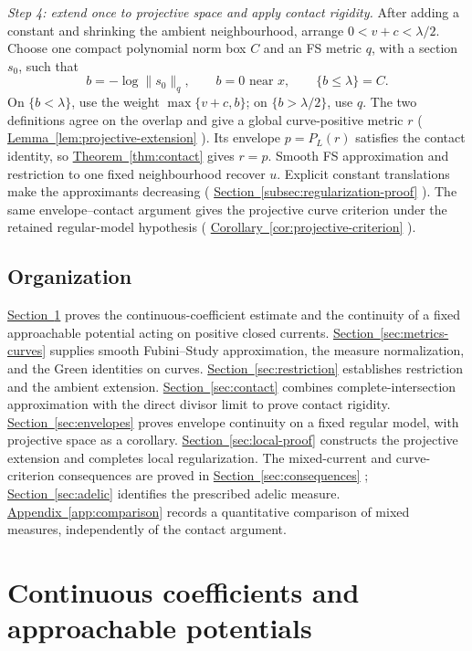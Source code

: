 \documentclass[11pt]{amsart}
\theoremstyle{definition}
\theoremstyle{remark}
\numberwithin{equation}{section}
\newcommand{\namedref}[2]{%
 \begingroup
 \ifstrequal{#1}{Section}{\hypersetup{linkcolor=sectionteal}}{%
  \ifstrequal{#1}{Appendix}{\hypersetup{linkcolor=sectionteal}}{}}%
 \hyperref[#2]{#1~\ref*{#2}}%
 \endgroup}
\begin{document}
\emph{Step 4: extend once to projective space and apply contact rigidity.}
After adding a constant and shrinking the ambient neighbourhood, arrange
\(0<v+c<\lambda/2\). Choose one compact polynomial norm box \(C\) and
an FS metric \(q\), with a section \(s_0\), such that
\[
 b=-\log\|s_0\|_q,\qquad b=0\text{ near }x,
 \qquad\{b\le\lambda\}=C.
\]
On \(\{b<\lambda\}\), use the weight \(\max\{v+c,b\}\); on
\(\{b>\lambda/2\}\), use \(q\). The two definitions agree on the
overlap and give a global curve-positive metric \(r\)
(\namedref{Lemma}{lem:projective-extension}). Its envelope \(p=P_L(r)\)
satisfies the contact identity, so \namedref{Theorem}{thm:contact} gives
\(r=p\). Smooth FS approximation and restriction to one fixed
neighbourhood recover \(u\). Explicit constant translations make the
approximants decreasing (\namedref{Section}{subsec:regularization-proof}).
The same envelope--contact argument gives the projective curve criterion
under the retained regular-model hypothesis
(\namedref{Corollary}{cor:projective-criterion}).

\subsection{Organization}
\namedref{Section}{sec:coefficients} proves the continuous-coefficient
estimate and the continuity of a fixed approachable potential acting
on positive closed currents. \namedref{Section}{sec:metrics-curves} supplies
smooth Fubini--Study approximation, the measure normalization, and
the Green identities on curves. \namedref{Section}{sec:restriction}
establishes restriction and the ambient extension.
\namedref{Section}{sec:contact} combines complete-intersection approximation
with the direct divisor limit to prove contact rigidity.
\namedref{Section}{sec:envelopes} proves envelope continuity on a fixed regular
model, with projective space as a corollary. \namedref{Section}{sec:local-proof}
constructs the projective extension and completes local regularization. The mixed-current and curve-criterion consequences are
proved in \namedref{Section}{sec:consequences}; \namedref{Section}{sec:adelic}
identifies the prescribed adelic measure.
\namedref{Appendix}{app:comparison} records a quantitative comparison of
mixed measures, independently of the contact argument.

\section{Continuous coefficients and approachable potentials}
\label{sec:coefficients}
\end{document}
